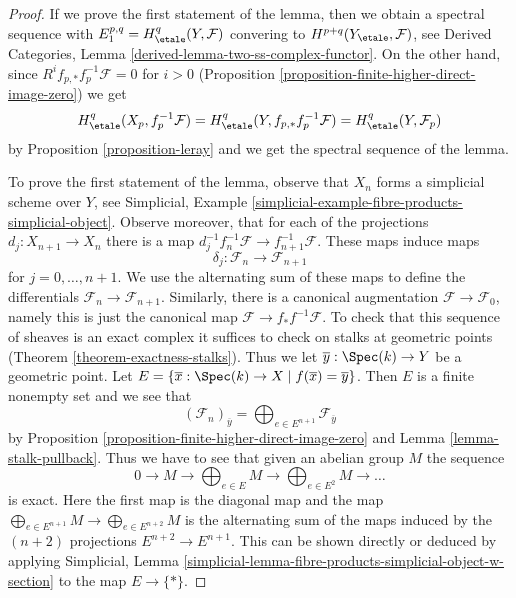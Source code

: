 \begin{proof}
If we prove the first statement of the lemma, then we obtain a spectral
sequence with $E_1^{p, q} = H^q_\etale(Y, \mathcal{F})$ convering
to $H^{p + q}(Y_\etale, \mathcal{F})$, see
Derived Categories, Lemma \ref{derived-lemma-two-ss-complex-functor}.
On the other hand, since
$R^if_{p, *}f_p^{-1}\mathcal{F} = 0$ for $i > 0$
(Proposition \ref{proposition-finite-higher-direct-image-zero})
we get
$$
H^q_\etale(X_p, f_p^{-1}\mathcal{F}) =
H^q_\etale(Y, f_{p, *}f_p^{-1} \mathcal{F}) =
H^q_\etale(Y, \mathcal{F}_p)
$$
by Proposition \ref{proposition-leray}
and we get the spectral sequence of the lemma.

\medskip\noindent
To prove the first statement of the lemma, observe that
$X_n$ forms a simplicial scheme over $Y$, see
Simplicial, Example \ref{simplicial-example-fibre-products-simplicial-object}.
Observe moreover, that for each of the projections
$d_j : X_{n + 1} \to X_n$ there is a map
$d_j^{-1} f_n^{-1}\mathcal{F} \to f_{n + 1}^{-1}\mathcal{F}$.
These maps induce maps
$$
\delta_j : \mathcal{F}_n \to \mathcal{F}_{n + 1}
$$
for $j = 0, \ldots, n + 1$. We use the alternating sum of these maps
to define the differentials $\mathcal{F}_n \to \mathcal{F}_{n + 1}$.
Similarly, there is a canonical augmentation $\mathcal{F} \to \mathcal{F}_0$,
namely this is just the canonical map $\mathcal{F} \to f_*f^{-1}\mathcal{F}$.
To check that this sequence of sheaves is an exact complex it suffices
to check on stalks at geometric points (Theorem \ref{theorem-exactness-stalks}).
Thus we let $\overline{y} : \Spec(k) \to Y$ be a geometric point. Let
$E = \{\overline{x} : \Spec(k) \to X \mid f(\overline{x}) = \overline{y}\}$.
Then $E$ is a finite nonempty set and we see that
$$
(\mathcal{F}_n)_{\overline{y}} =
\bigoplus\nolimits_{e \in E^{n + 1}} \mathcal{F}_{\overline{y}}
$$
by Proposition \ref{proposition-finite-higher-direct-image-zero}
and Lemma \ref{lemma-stalk-pullback}.
Thus we have to see that given an abelian group $M$ the sequence
$$
0 \to M \to \bigoplus\nolimits_{e \in E} M \to
\bigoplus\nolimits_{e \in E^2} M \to \ldots
$$
is exact. Here the first map is the diagonal map and the map
$\bigoplus_{e \in E^{n + 1}} M  \to \bigoplus_{e \in E^{n + 2}} M$
is the alternating sum of the maps induced by the $(n + 2)$
projections $E^{n + 2} \to E^{n + 1}$. This can be shown directly
or deduced by applying Simplicial, Lemma
\ref{simplicial-lemma-fibre-products-simplicial-object-w-section}
to the map $E \to \{*\}$.
\end{proof}

